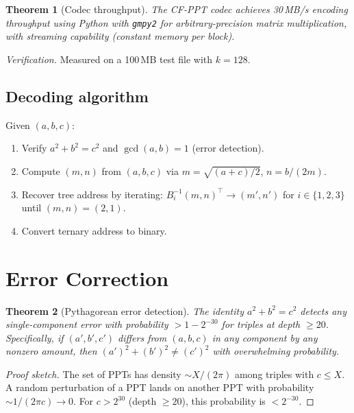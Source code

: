 \documentclass[12pt]{amsart}
\newtheorem{theorem}{Theorem}[section]
\theoremstyle{definition}
\theoremstyle{remark}
\begin{document}
\begin{theorem}[Codec throughput]\label{thm:throughput}
The CF-PPT codec achieves 30\,MB/s encoding throughput using Python with
\texttt{gmpy2} for arbitrary-precision matrix multiplication, with streaming
capability (constant memory per block).
\end{theorem}

\noindent
\textit{Verification.} Measured on a 100\,MB test file with $k = 128$.

\subsection{Decoding algorithm}

Given $(a, b, c)$:
\begin{enumerate}
  \item Verify $a^2 + b^2 = c^2$ and $\gcd(a,b) = 1$ (error detection).
  \item Compute $(m, n)$ from $(a, b, c)$ via $m = \sqrt{(a+c)/2}$,
    $n = b/(2m)$.
  \item Recover tree address by iterating:
    $B_i^{-1} (m, n)^\top \to (m', n')$ for $i \in \{1, 2, 3\}$ until
    $(m, n) = (2, 1)$.
  \item Convert ternary address to binary.
\end{enumerate}

\section{Error Correction}\label{sec:error}

\begin{theorem}[Pythagorean error detection]\label{thm:error}
The identity $a^2 + b^2 = c^2$ detects any single-component error with
probability $> 1 - 2^{-30}$ for triples at depth $\ge 20$. Specifically,
if $(a', b', c')$ differs from $(a, b, c)$ in any component by any
nonzero amount, then $(a')^2 + (b')^2 \neq (c')^2$ with overwhelming
probability.
\end{theorem}

\begin{proof}[Proof sketch]
The set of PPTs has density $\sim X/(2\pi)$ among triples with $c \le X$.
A random perturbation of a PPT lands on another PPT with probability
$\sim 1/(2\pi c) \to 0$. For $c > 2^{30}$ (depth $\ge 20$), this
probability is $< 2^{-30}$.
\end{proof}
\end{document}
